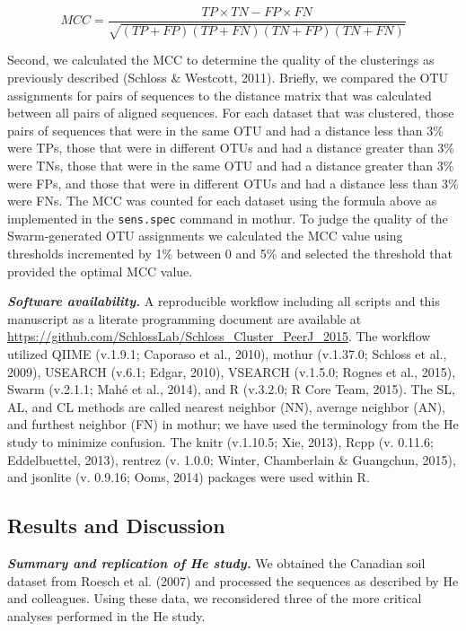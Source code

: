 \documentclass[11pt,]{article}
\begin{document}
\[
MCC = \frac{TP \times TN - FP \times FN}{\sqrt{(TP +FP)(TP+FN)(TN+FP)(TN+FN)} }
\]

Second, we calculated the MCC to determine the quality of the
clusterings as previously described (Schloss \& Westcott, 2011).
Briefly, we compared the OTU assignments for pairs of sequences to the
distance matrix that was calculated between all pairs of aligned
sequences. For each dataset that was clustered, those pairs of sequences
that were in the same OTU and had a distance less than 3\% were TPs,
those that were in different OTUs and had a distance greater than 3\%
were TNs, those that were in the same OTU and had a distance greater
than 3\% were FPs, and those that were in different OTUs and had a
distance less than 3\% were FNs. The MCC was counted for each dataset
using the formula above as implemented in the \texttt{sens.spec} command
in mothur. To judge the quality of the Swarm-generated OTU assignments
we calculated the MCC value using thresholds incremented by 1\% between
0 and 5\% and selected the threshold that provided the optimal MCC
value.

\textbf{\emph{Software availability.}} A reproducible workflow including
all scripts and this manuscript as a literate programming document are
available at
\url{https://github.com/SchlossLab/Schloss_Cluster_PeerJ_2015}. The
workflow utilized QIIME (v.1.9.1; Caporaso et al., 2010), mothur
(v.1.37.0; Schloss et al., 2009), USEARCH (v.6.1; Edgar, 2010), VSEARCH
(v.1.5.0; Rognes et al., 2015), Swarm (v.2.1.1; Mahé et al., 2014), and
R (v.3.2.0; R Core Team, 2015). The SL, AL, and CL methods are called
nearest neighbor (NN), average neighbor (AN), and furthest neighbor (FN)
in mothur; we have used the terminology from the He study to minimize
confusion. The knitr (v.1.10.5; Xie, 2013), Rcpp (v. 0.11.6;
Eddelbuettel, 2013), rentrez (v. 1.0.0; Winter, Chamberlain \&
Guangchun, 2015), and jsonlite (v. 0.9.16; Ooms, 2014) packages were
used within R.

\subsection{Results and Discussion}\label{results-and-discussion}

\textbf{\emph{Summary and replication of He study.}} We obtained the
Canadian soil dataset from Roesch et al. (2007) and processed the
sequences as described by He and colleagues. Using these data, we
reconsidered three of the more critical analyses performed in the He
study.
\end{document}
